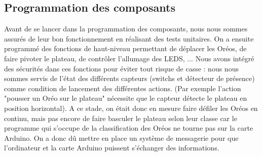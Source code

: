 \documentclass{article}
\begin{document}
\subsection{Programmation des composants}
Avant de se lancer dans la programmation des composants, nous nous sommes assurés de leur bon fonctionnement en réalisant des tests unitaires.
On a ensuite programmé des fonctions de haut-niveau permettant de déplacer les Oréos, de faire pivoter le plateau, de contrôler l'allumage des LEDS, ... 
Nous avons intégré des sécurités dans ces fonctions pour éviter tout risque de casse : nous nous sommes servis de l'état des différents capteurs (switchs et détecteur de présence) comme condition de lancement des différentes actions. (Par exemple l'action "pousser un Oréo sur le plateau" nécessite que le capteur détecte le plateau en position horizontal).
A ce stade, on était donc en mesure faire défiler les Oréos en continu, mais pas encore de faire basculer le plateau selon leur classe car le programme qui s'occupe de la classification des Oréos ne tourne pas sur la carte Arduino.
On a donc dû mettre en place un système de messagerie pour que l'ordinateur et la carte Arduino puissent s'échanger des informations.
\end{document}
